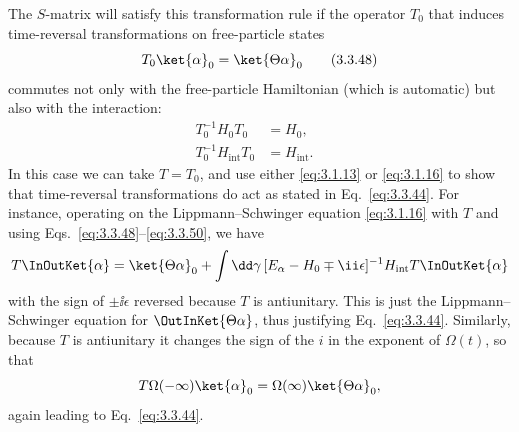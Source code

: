 The $S$-matrix will satisfy this transformation rule if the operator $T_0$ that
induces time-reversal transformations on free-particle states
\begin{equation}
T_0\ket{\alpha}_0=\ket{\Theta\alpha}_0
\tag{3.3.48}\label{eq:3.3.48}
\end{equation}
commutes not only with the free-particle Hamiltonian (which is automatic) but also
with the interaction:
\begin{align}
T_0^{-1}H_0T_0&=H_0,
&\tag{3.3.49}\label{eq:3.3.49}\\
T_0^{-1}H_{\mathrm{int}}T_0&=H_{\mathrm{int}}.
&\tag{3.3.50}\label{eq:3.3.50}
\end{align}
In this case we can take $T=T_0$, and use either \eqref{eq:3.1.13} or \eqref{eq:3.1.16} to show that
time-reversal transformations do act as stated in Eq.~\eqref{eq:3.3.44}. For instance,
operating on the Lippmann--Schwinger equation \eqref{eq:3.1.16} with $T$ and using
Eqs.~\eqref{eq:3.3.48}--\eqref{eq:3.3.50}, we have
\[
T\InOutKet{\alpha}
=\ket{\Theta\alpha}_0+\int \dd\gamma\,
[E_\alpha-H_0\mp \ii\epsilon]^{-1}H_{\mathrm{int}}
T\InOutKet{\alpha}
\]
with the sign of $\pm \ii\epsilon$ reversed because $T$ is antiunitary. This is just
the Lippmann--Schwinger equation for $\OutInKet{\Theta\alpha}$, thus
justifying Eq.~\eqref{eq:3.3.44}. Similarly, because $T$ is antiunitary it changes the sign
of the $i$ in the exponent of $\Omega(t)$, so that
\[
T\Omega(-\infty)\ket{\alpha}_0=\Omega(\infty)\ket{\Theta\alpha}_0,
\]
again leading to Eq.~\eqref{eq:3.3.44}.

